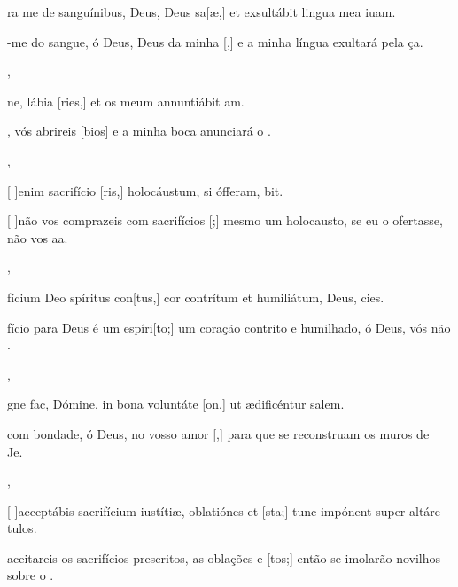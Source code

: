 {  {\item {}ra me de sanguínibus, Deus, Deus sa[æ,] et exsultábit lingua mea iuam.~\Antiphona}%
    {\item {}-me do sangue, ó Deus, Deus da minha [,] e a minha língua exultará pela ça.~\Antiphona},
  {\item {}ne, lábia [ries,] et os meum annuntiábit am.~\Antiphona}%
    {\item {}, vós abrireis [bios] e a minha boca anunciará o .~\Antiphona},
  {\item {}[ ]{e}nim sacrifício [ris,] holocáustum, si ófferam, bit.~\Antiphona}%
    {\item {}[ ]{não} vos comprazeis com sacrifícios [;] mesmo um holocausto, se eu o ofertasse, não vos aa.~\Antiphona},
  {\item {}fícium Deo spíritus con[tus,] cor contrítum et humiliátum, Deus, cies.~\Antiphona}%
    {\item {}fício para Deus é um espíri[to;] um coração contrito e humilhado, ó Deus, vós não .~\Antiphona},
  {\item {}gne fac, Dómine, in bona voluntáte [on,] ut ædificéntur salem.~\Antiphona}%
    {\item {} com bondade, ó Deus, no vosso amor [,] para que se reconstruam os muros de Je.~\Antiphona},
  {\item {}[ ]{ac}ceptábis sacrifícium iustítiæ, oblatiónes et [\-sta;] tunc impónent super altáre tu\-los.~\Antiphona}%
    {\item {} aceitareis os sacrifícios prescritos, as oblações e [tos;] então se imolarão novilhos sobre o .~\Antiphona}
}